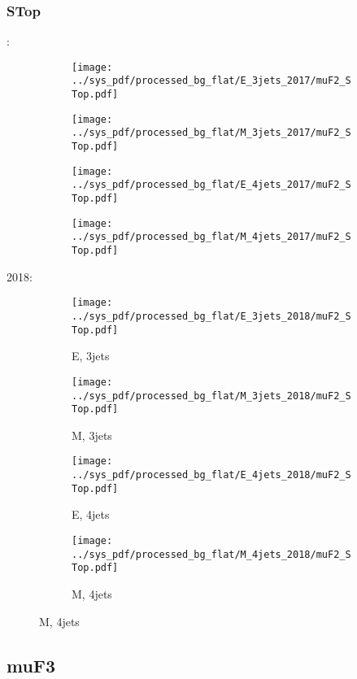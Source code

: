 \documentclass{beamer}
\begin{document}
\begin{frame}
\frametitle{STop}
\fontsize{5}{1}:
\begin{figure}
\centering
\begin{subfigure}[b]{0.24\textwidth}
\texttt{[image: ../sys\_pdf/processed\_bg\_flat/E\_3jets\_2017/muF2\_STop.pdf]}
\end{subfigure}
\begin{subfigure}[b]{0.24\textwidth}
\texttt{[image: ../sys\_pdf/processed\_bg\_flat/M\_3jets\_2017/muF2\_STop.pdf]}
\end{subfigure}
\begin{subfigure}[b]{0.24\textwidth}
\texttt{[image: ../sys\_pdf/processed\_bg\_flat/E\_4jets\_2017/muF2\_STop.pdf]}
\end{subfigure}
\begin{subfigure}[b]{0.24\textwidth}
\texttt{[image: ../sys\_pdf/processed\_bg\_flat/M\_4jets\_2017/muF2\_STop.pdf]}
\end{subfigure}
\end{figure}
2018:
\begin{figure}
\centering
\begin{subfigure}[b]{0.24\textwidth}
\texttt{[image: ../sys\_pdf/processed\_bg\_flat/E\_3jets\_2018/muF2\_STop.pdf]}
\captionsetup{font=tiny}
\caption{E, 3jets}
\end{subfigure}
\begin{subfigure}[b]{0.24\textwidth}
\texttt{[image: ../sys\_pdf/processed\_bg\_flat/M\_3jets\_2018/muF2\_STop.pdf]}
\captionsetup{font=tiny}
\caption{M, 3jets}
\end{subfigure}
\begin{subfigure}[b]{0.24\textwidth}
\texttt{[image: ../sys\_pdf/processed\_bg\_flat/E\_4jets\_2018/muF2\_STop.pdf]}
\captionsetup{font=tiny}
\caption{E, 4jets}
\end{subfigure}
\begin{subfigure}[b]{0.24\textwidth}
\texttt{[image: ../sys\_pdf/processed\_bg\_flat/M\_4jets\_2018/muF2\_STop.pdf]}
\captionsetup{font=tiny}
\caption{M, 4jets}
\end{subfigure}
\end{figure}
\end{frame}


\subsection{muF3}
\end{document}
